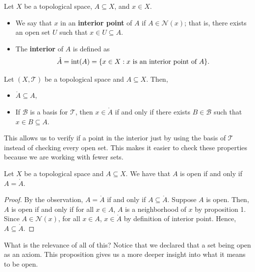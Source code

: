 \begin{definition}
 Let \( X  \) be a topological space, \( A \subseteq  X  \), and \( x \in X  \).
   \begin{itemize}
       \item We say that \( x  \) in an \textbf{interior point} of \( A  \) if \( A \in \mathcal{N}(x) \); that is, there exists an open set \( U  \) such that \( x \in U \subseteq A  \).
        \item The \textbf{interior} of \( A  \) is defined as
            \[  \mathring{A} = \text{int}(A) = \{  x \in X : x \ \text{is an interior point of \( A  \)} \}.  \]
   \end{itemize} 
\end{definition}

\begin{remark}
    Let \( (X,\mathcal{T}) \) be a topological space and \( A \subseteq X  \). Then, 
    \begin{itemize}
        \item \( \mathring{A} \subseteq A  \),
        \item If \( \mathcal{B} \) is a basis for \( \mathcal{T} \), then \( x \in \mathring{A} \) if and only if there exists \( B \in \mathcal{B} \) such that \( x \in B \subseteq  A  \).
    \end{itemize}
    This allows us to verify if a point in the interior just by using the basis of \( \mathcal{T} \) instead of checking every open set. This makes it easier to check these properties because we are working with fewer sets.
\end{remark}

\begin{prop}
    Let \( X  \) be a topological space and \( A \subseteq X  \). We have that \( A  \) is open if and only if \( A = \mathring{A} \).
\end{prop}

\begin{proof}
    By the observation, \( A = \mathring{A} \) if and only if \( A \subseteq \mathring{A} \). Suppose \( A  \) is open. Then, \( A  \) is open if and only if for all \( x \in A  \), \( A  \) is a neighborhood of \( x  \) by proposition 1. Since \( A \in \mathcal{N}(x) \), for all \( x \in A  \), \( x \in \mathring{A} \) by definition of interior point. Hence, \( A \subseteq \mathring{A} \).
\end{proof}

What is the relevance of all of this? Notice that we declared that a set being open as an axiom. This proposition gives us a more deeper insight into what it means to be open.  


